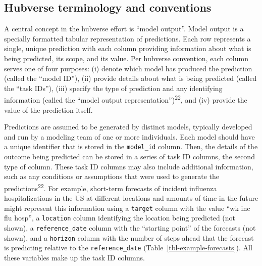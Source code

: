 \documentclass[
  letterpaper,
  DIV=11,
  numbers=noendperiod]{scrartcl}
\begin{document}
\subsection{Hubverse terminology and
conventions}\label{hubverse-terminology-and-conventions}

A central concept in the hubverse effort is ``model output''. Model
output is a specially formatted tabular representation of predictions.
Each row represents a single, unique prediction with each column
providing information about what is being predicted, its scope, and its
value. Per hubverse convention, each column serves one of four purposes:
(i) denote which model has produced the prediction (called the ``model
ID''), (ii) provide details about what is being predicted (called the
``task IDs''), (iii) specify the type of prediction and any identifying
information (called the ``model output
representation'')\textsuperscript{22}, and (iv) provide the value of the
prediction itself.

Predictions are assumed to be generated by distinct models, typically
developed and run by a modeling team of one or more individuals. Each
model should have a unique identifier that is stored in the
\texttt{model\_id} column. Then, the details of the outcome being
predicted can be stored in a series of task ID columns, the second type
of column. These task ID columns may also include additional
information, such as any conditions or assumptions that were used to
generate the predictions\textsuperscript{22}. For example, short-term
forecasts of incident influenza hospitalizations in the US at different
locations and amounts of time in the future might represent this
information using a \texttt{target} column with the value ``wk inc flu
hosp'', a \texttt{location} column identifying the location being
predicted (not shown), a \texttt{reference\_date} column with the
``starting point'' of the forecasts (not shown), and a \texttt{horizon}
column with the number of steps ahead that the forecast is predicting
relative to the \texttt{reference\_date}
(Table~\ref{tbl-example-forecasts}). All these variables make up the
task ID columns.
\end{document}
